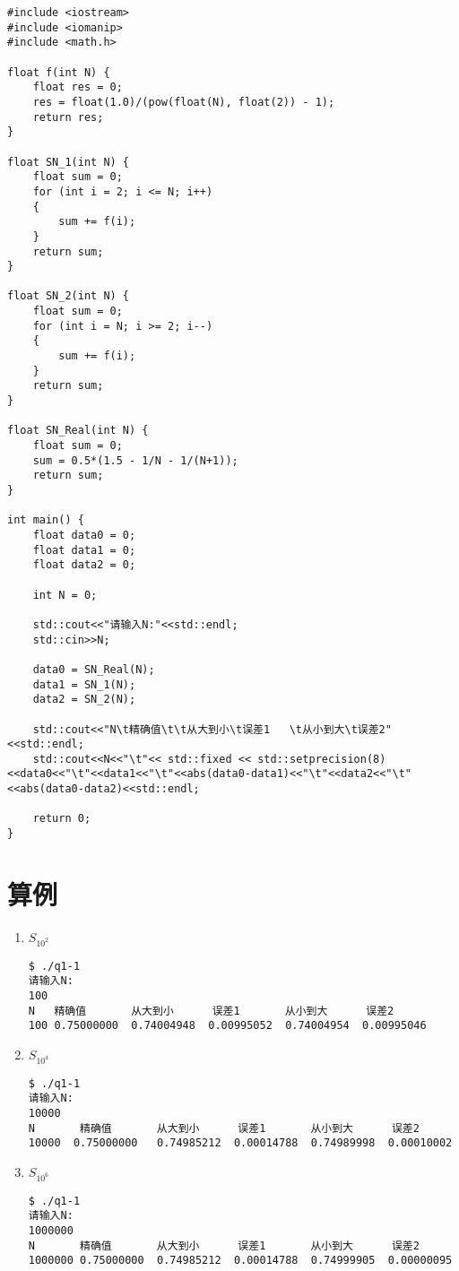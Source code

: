 \begin{lstlisting}[style = cpp]
#include <iostream>
#include <iomanip>
#include <math.h>

float f(int N) {
    float res = 0;
    res = float(1.0)/(pow(float(N), float(2)) - 1);
    return res;
}

float SN_1(int N) {
    float sum = 0;
    for (int i = 2; i <= N; i++)
    {
        sum += f(i);
    }
    return sum;
}

float SN_2(int N) {
    float sum = 0;
    for (int i = N; i >= 2; i--)
    {
        sum += f(i);
    }
    return sum;
}

float SN_Real(int N) {
    float sum = 0;
    sum = 0.5*(1.5 - 1/N - 1/(N+1));
    return sum;
}

int main() {
    float data0 = 0;
    float data1 = 0;
    float data2 = 0;

    int N = 0;

    std::cout<<"请输入N:"<<std::endl;
    std::cin>>N;

    data0 = SN_Real(N);
    data1 = SN_1(N);
    data2 = SN_2(N);

    std::cout<<"N\t精确值\t\t从大到小\t误差1   \t从小到大\t误差2"<<std::endl;
    std::cout<<N<<"\t"<< std::fixed << std::setprecision(8)<<data0<<"\t"<<data1<<"\t"<<abs(data0-data1)<<"\t"<<data2<<"\t"<<abs(data0-data2)<<std::endl;

    return 0;
}
\end{lstlisting}

\section{算例}

\begin{enumerate}
    \item $S_{10^2}$

    \begin{lstlisting}[style = cpp]
$ ./q1-1
请输入N:
100
N   精确值       从大到小      误差1       从小到大      误差2
100 0.75000000  0.74004948  0.00995052  0.74004954  0.00995046
    \end{lstlisting}

    \item $S_{10^4}$

    \begin{lstlisting}[style = cpp]
$ ./q1-1
请输入N:
10000
N       精确值       从大到小      误差1       从小到大      误差2
10000  0.75000000   0.74985212  0.00014788  0.74989998  0.00010002
    \end{lstlisting}

    \item $S_{10^6}$

    \begin{lstlisting}[style = cpp]
$ ./q1-1
请输入N:
1000000
N       精确值       从大到小      误差1       从小到大      误差2
1000000 0.75000000  0.74985212  0.00014788  0.74999905  0.00000095
    \end{lstlisting}

\end{enumerate}


